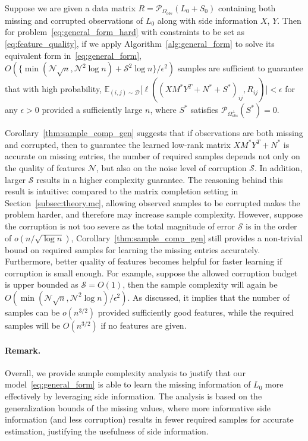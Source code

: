 \documentclass[twoside,11pt]{article}
\def\Obs{\Omega_{obs}}
\def\dist{{\mathcal D}}
\newcommand\Ex[2]{{\mathbb E}_{#1}\big[#2\big]}
\newcommand\proj[1]{{\mathcal P}_{#1}}
\def\nmax{{\mathcal N}}
\def\smax{{\mathcal S}}
\def\realL{L_0}
\def\realS{S_0}
\def\optM{M^*}
\def\optN{N^*}
\def\optS{S^*}
\begin{document}
\begin{corollary} %
  Suppose we are given a data matrix $R = \proj{\Obs}(\realL+\realS)$ containing both missing and corrupted
  observations of $\realL$ along with side information $X$, $Y$.
Then for problem~\eqref{eq:general_form_hard} with constraints
to be set as \eqref{eq:feature_quality}, if we apply Algorithm~\ref{alg:general_form}
to solve its equivalent form in~\eqref{eq:general_form},
$O(\{\min(\nmax\sqrt{n}, \nmax^2\log{n})+\smax^2\log{n}\}/\epsilon^2)$
samples are sufficient to guarantee that with high probability,
$\Ex{(i,j)\sim\dist} {\ell((X\optM Y^T\!+\!\optN\!+\!\optS)_{ij}, R_{ij})}\!<\!\epsilon$ for any $\epsilon > 0$ provided a sufficiently large $n$,
where $\optS$ satisfies $\proj{\Obs^\perp}(\optS) = 0$.
\label{thm:sample_comp_gen}
\end{corollary}

Corollary~\ref{thm:sample_comp_gen} suggests that if observations are
both missing and corrupted, then
to guarantee the learned low-rank matrix $X\optM Y^T+\optN$ is accurate on missing entries,
the number of required samples
depends not only on the quality of features $\nmax$, but also on
the noise level of corruption $\smax$.  In addition, larger $\smax$ results in
a higher complexity guarantee.
The reasoning behind this result is intuitive: compared to the matrix completion
setting in Section~\ref{subsec:theory.mc}, allowing observed samples to be corrupted
makes the problem harder, and therefore may increase sample complexity.
However, suppose the corruption is not too severe as
the total magnitude of error $\smax$ is in the order of
$o(n/\sqrt{\log{n}})$,
Corollary~\ref{thm:sample_comp_gen} still provides a non-trivial bound on
required samples for learning the missing entries accurately.  Furthermore,
better quality of features becomes helpful for faster learning if corruption is small enough.
For example, suppose the allowed corruption budget is upper bounded as
$\smax = O(1)$, then the sample complexity
will again be $O(\min(\nmax\sqrt{n}, \nmax^2\log{n})/\epsilon^2)$.
As discussed, it implies that the number of samples can be
$o(n^{3/2})$ provided sufficiently good features,
while the required samples will be $O(n^{3/2})$ if no features are given.

\paragraph{Remark.}  Overall, we provide sample complexity analysis to justify that
our model~\eqref{eq:general_form} is able to learn the missing information of
$\realL$ more effectively by leveraging side information.
The analysis is based on the generalization bounds of the missing values,
where more informative
side information (and less corruption) results in fewer required samples for accurate
estimation, justifying the usefulness of side information.
\end{document}
